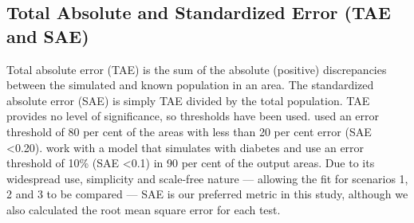 \documentclass[a4paper,10pt]{article}
\begin{document}
\subsection{Total Absolute and Standardized Error (TAE and SAE)}
Total absolute error (TAE) is the sum of the absolute (positive)
discrepancies between the simulated
and known population in an area. The standardized absolute error (SAE) is
simply TAE divided by the total population. 
TAE provides no level of significance, so thresholds have been used.
\citet{clarke2001regional} used an error threshold of 80 per cent of the
areas with less than 20 per cent error (SAE \textless 0.20). %
\citet{smith2007simhealth} work with a model that simulates with diabetes and
use an error threshold of 10\% (SAE \textless 0.1)
in 90 per cent of the output areas. %
Due to its widespread use, simplicity and scale-free nature --- allowing the fit
for scenarios 1, 2 and 3 to be compared --- SAE is our preferred
metric in this study, although we also calculated the root mean square error
for each test.

% 
% 
% 
\end{document}
